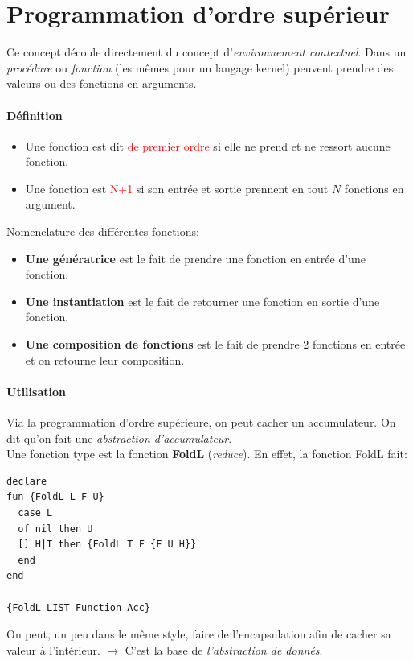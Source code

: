 \documentclass{report}
\begin{document}
\chapter{Programmation d'ordre supérieur}
Ce concept découle directement du concept d'\textit{environnement contextuel}. Dans un \textit{procédure} ou \textit{fonction} (les mêmes pour un langage kernel) peuvent prendre des valeurs ou des fonctions en arguments.
\subsubsection{Définition}
\begin{itemize}
\item Une fonction est dit \textcolor{red}{de premier ordre} si elle ne prend et ne ressort aucune fonction.
\item Une fonction est \textcolor{red}{N+1} si son entrée et sortie prennent en tout $N$ fonctions en argument.
\end{itemize}
Nomenclature des différentes fonctions:
\begin{itemize}
\item \textbf{Une génératrice} est le fait de prendre une fonction en entrée d'une fonction.
\item \textbf{Une instantiation} est le fait de retourner une fonction en sortie d'une fonction.
\item \textbf{Une composition de fonctions} est le fait de prendre 2 fonctions en entrée et on retourne leur composition.
\end{itemize}

\subsubsection{Utilisation}
Via la programmation d'ordre supérieure, on peut cacher un accumulateur. On dit qu'on fait une \textit{abstraction d'accumulateur}.\\
Une fonction type est la fonction \textbf{FoldL} (\textit{reduce}). En effet, la fonction FoldL fait:
\begin{lstlisting}
declare
fun {FoldL L F U}
  case L
  of nil then U
  [] H|T then {FoldL T F {F U H}}
  end
end

{FoldL LIST Function Acc}
\end{lstlisting}
On peut, un peu dans le même style, faire de l'encapsulation afin de cacher sa valeur à l'intérieur. $\rightarrow$ C'est la base de \textit{l'abstraction de donnés}.\\
\end{document}
